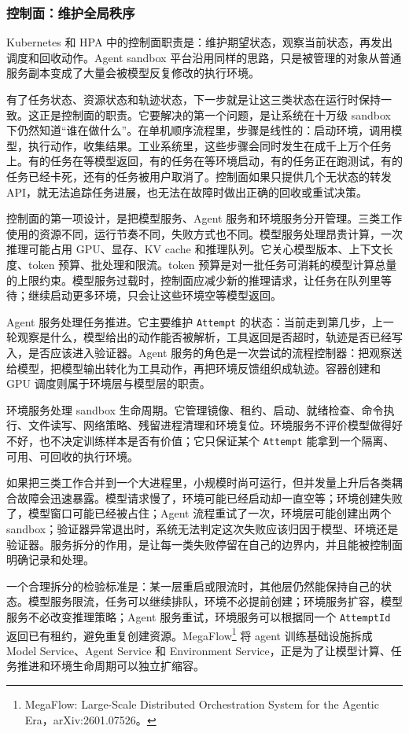 \subsubsection{控制面：维护全局秩序}
\label{sec6:agent-control-plane}

Kubernetes 和 HPA 中的控制面职责是：维护期望状态，观察当前状态，再发出调度和回收动作。Agent sandbox 平台沿用同样的思路，只是被管理的对象从普通服务副本变成了大量会被模型反复修改的执行环境。

有了任务状态、资源状态和轨迹状态，下一步就是让这三类状态在运行时保持一致。这正是控制面的职责。它要解决的第一个问题，是让系统在十万级 sandbox 下仍然知道“谁在做什么”。在单机顺序流程里，步骤是线性的：启动环境，调用模型，执行动作，收集结果。工业系统里，这些步骤会同时发生在成千上万个任务上。有的任务在等模型返回，有的任务在等环境启动，有的任务正在跑测试，有的任务已经卡死，还有的任务被用户取消了。控制面如果只提供几个无状态的转发 API，就无法追踪任务进展，也无法在故障时做出正确的回收或重试决策。

控制面的第一项设计，是把模型服务、Agent 服务和环境服务分开管理。三类工作使用的资源不同，运行节奏不同，失败方式也不同。模型服务处理昂贵计算，一次推理可能占用 GPU、显存、KV cache 和推理队列。它关心模型版本、上下文长度、token 预算、批处理和限流。token 预算是对一批任务可消耗的模型计算总量的上限约束。模型服务过载时，控制面应减少新的推理请求，让任务在队列里等待；继续启动更多环境，只会让这些环境空等模型返回。

Agent 服务处理任务推进。它主要维护 \texttt{Attempt} 的状态：当前走到第几步，上一轮观察是什么，模型给出的动作能否被解析，工具返回是否超时，轨迹是否已经写入，是否应该进入验证器。Agent 服务的角色是一次尝试的流程控制器：把观察送给模型，把模型输出转化为工具动作，再把环境反馈组织成轨迹。容器创建和 GPU 调度则属于环境层与模型层的职责。

环境服务处理 sandbox 生命周期。它管理镜像、租约、启动、就绪检查、命令执行、文件读写、网络策略、残留进程清理和环境复位。环境服务不评价模型做得好不好，也不决定训练样本是否有价值；它只保证某个 \texttt{Attempt} 能拿到一个隔离、可用、可回收的执行环境。

如果把三类工作合并到一个大进程里，小规模时尚可运行，但并发量上升后各类耦合故障会迅速暴露。模型请求慢了，环境可能已经启动却一直空等；环境创建失败了，模型窗口可能已经被占住；Agent 流程重试了一次，环境层可能创建出两个 sandbox；验证器异常退出时，系统无法判定这次失败应该归因于模型、环境还是验证器。服务拆分的作用，是让每一类失败停留在自己的边界内，并且能被控制面明确记录和处理。

一个合理拆分的检验标准是：某一层重启或限流时，其他层仍然能保持自己的状态。模型服务限流，任务可以继续排队，环境不必提前创建；环境服务扩容，模型服务不必改变推理策略；Agent 服务重试，环境服务可以根据同一个 \texttt{AttemptId} 返回已有租约，避免重复创建资源。MegaFlow\footnote{MegaFlow: Large-Scale Distributed Orchestration System for the Agentic Era，arXiv:2601.07526。} 将 agent 训练基础设施拆成 Model Service、Agent Service 和 Environment Service，正是为了让模型计算、任务推进和环境生命周期可以独立扩缩容。

